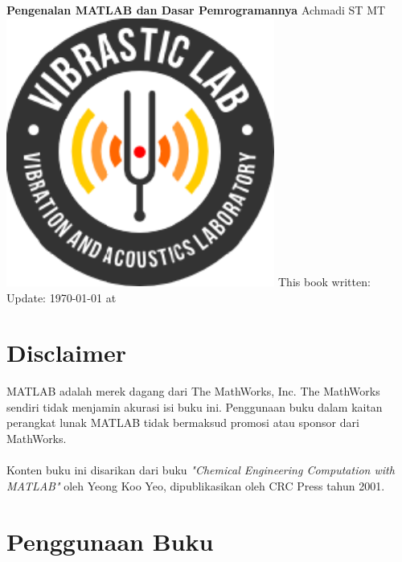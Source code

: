 \documentclass[12pt]{book}
\date{}
\begin{document}
	\frontmatter
	\begin{titlepage}
		\centering
		{\LARGE \bf Pengenalan MATLAB dan Dasar Pemrogramannya}
		\vfill
		{\Large Achmadi ST MT}
		\vfill
		\includegraphics[width=250pt]{images/logo/logoviblab}
		\vfill
		\vfill
		\noindent This book written:\\
		Update: {\today} at \currenttime\\
	\end{titlepage}


	\newpage
	\tableofcontents


	\newpage
	\chapter{Disclaimer}

	MATLAB adalah merek dagang dari The MathWorks, Inc.
	The MathWorks sendiri tidak menjamin akurasi isi buku ini.
	Penggunaan buku dalam kaitan perangkat lunak MATLAB tidak bermaksud promosi atau sponsor dari MathWorks.
	\\
	\\
	Konten buku ini disarikan dari buku \textit{"Chemical Engineering Computation with MATLAB"} oleh Yeong Koo Yeo,
	dipublikasikan oleh CRC Press tahun 2001.


	\newpage
	\chapter{Penggunaan Buku}
\end{document}
